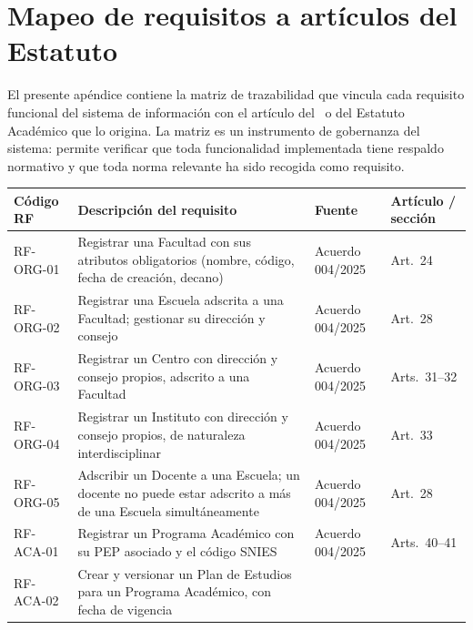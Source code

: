 \chapter{Mapeo de requisitos a artículos del Estatuto}
\label{apx:mapeo}

\noindent
El presente apéndice contiene la matriz de trazabilidad que vincula cada
requisito funcional del sistema de información con el artículo del
\acuerdo\ o del Estatuto Académico que lo origina. La matriz es un
instrumento de gobernanza del sistema: permite verificar que toda
funcionalidad implementada tiene respaldo normativo y que toda norma
relevante ha sido recogida como requisito.

\begin{longtable}{C{1.5cm} L{5cm} C{2cm} L{3.5cm}}
  \toprule
  \textbf{Código RF} & \textbf{Descripción del requisito} &
  \textbf{Fuente} & \textbf{Artículo / sección} \\
  \midrule
  \endhead
  RF-ORG-01 & Registrar una Facultad con sus atributos obligatorios
               (nombre, código, fecha de creación, decano)
             & Acuerdo 004/2025 & Art.~24 \\
  \midrule
  RF-ORG-02 & Registrar una Escuela adscrita a una Facultad;
               gestionar su dirección y consejo
             & Acuerdo 004/2025 & Art.~28 \\
  \midrule
  RF-ORG-03 & Registrar un Centro con dirección y consejo propios,
               adscrito a una Facultad
             & Acuerdo 004/2025 & Arts.~31--32 \\
  \midrule
  RF-ORG-04 & Registrar un Instituto con dirección y consejo propios,
               de naturaleza interdisciplinar
             & Acuerdo 004/2025 & Art.~33 \\
  \midrule
  RF-ORG-05 & Adscribir un Docente a una Escuela; un docente no puede
               estar adscrito a más de una Escuela simultáneamente
             & Acuerdo 004/2025 & Art.~28 \\
  \midrule
  RF-ACA-01 & Registrar un Programa Académico con su PEP asociado
               y el código SNIES
             & Acuerdo 004/2025 & Arts.~40--41 \\
  \midrule
  RF-ACA-02 & Crear y versionar un Plan de Estudios para un Programa
               Académico, con fecha de vigencia

\end{longtable}
